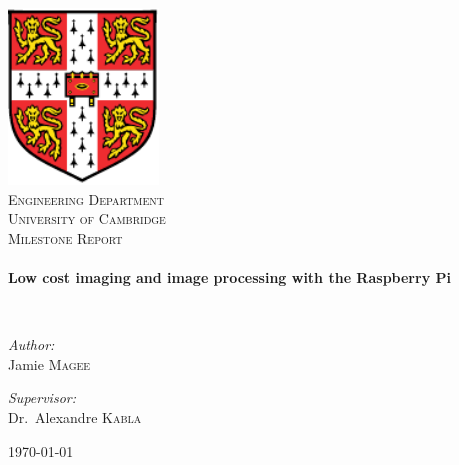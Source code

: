 \begin{titlepage}
\begin{center}

\includegraphics[width=0.3\textwidth]{./University_Crest}~\\[1cm]

\textsc{\LARGE Engineering Department}\\[.5cm]
\textsc{\LARGE University of Cambridge}\\[1.5cm]

\textsc{\Large Milestone Report}\\[0.5cm]

\HRule \\[0.4cm]
{ \huge \bfseries Low cost imaging and image processing with the
  Raspberry Pi \\[0.4cm] }

\HRule \\[1.5cm]

\begin{minipage}{0.4\textwidth}
\begin{flushleft} \large
\emph{Author:}\\
Jamie \textsc{Magee}
\end{flushleft}
\end{minipage}
\begin{minipage}{0.4\textwidth}
\begin{flushright} \large
\emph{Supervisor:} \\
Dr.~Alexandre \textsc{Kabla}
\end{flushright}
\end{minipage}

\vfill

{\large \today}

\end{center}
\end{titlepage}